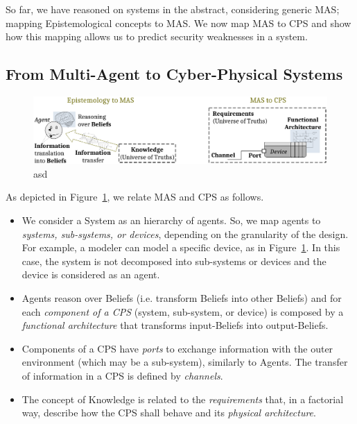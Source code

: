 \documentclass[conference]{IEEEtran}
\begin{document}
So far, we have reasoned on systems in the abstract, considering
generic MAS; mapping Epistemological concepts
to MAS. We now map MAS to CPS and show how this mapping allows us
to predict security weaknesses in a system.

\subsection{From Multi-Agent to Cyber-Physical Systems}
\begin{figure}[t]
	\centering
	\includegraphics[width=.9\textwidth]{mashyp.pdf}
	\caption{asd}
	\label{fig:mashyp}
\end{figure}

As depicted in Figure~\ref{fig:mashyp}, we relate MAS and CPS as follows.
\begin{itemize}
	\item We consider a System as an hierarchy of agents. So, we map agents
		to \emph{systems, sub-systems, or devices}, depending on the
		granularity of the design. For example, a modeler can model a
		specific device, as in Figure~\ref{fig:mashyp}. In this case,
		the system is not decomposed into sub-systems or devices and
		the device is considered as an agent.
	\item Agents reason over Beliefs (i.e. transform Beliefs into other
		Beliefs) and for each \emph{component of a CPS} (system, sub-system,
		or device) is composed by a \emph{functional architecture} that
		transforms input-Beliefs into output-Beliefs.
	\item Components of a CPS have \emph{ports} to exchange information
		with the outer environment (which may be a sub-system),
		similarly to Agents. The transfer of information in a CPS is
		defined by \emph{channels}.
	\item The concept of Knowledge is related to the \emph{requirements}
		that, in a factorial way, describe how the CPS shall behave and
		its \emph{physical architecture}.

\end{itemize}
\end{document}
